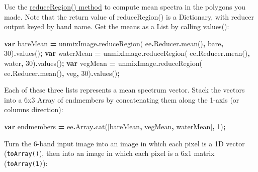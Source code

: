 \documentclass[
]{article}
\newenvironment{Shaded}{\begin{snugshade}}{\end{snugshade}}
\newcommand{\AttributeTok}[1]{\textcolor[rgb]{0.77,0.63,0.00}{#1}}
\newcommand{\DecValTok}[1]{\textcolor[rgb]{0.00,0.00,0.81}{#1}}
\newcommand{\FunctionTok}[1]{\textcolor[rgb]{0.00,0.00,0.00}{#1}}
\newcommand{\KeywordTok}[1]{\textcolor[rgb]{0.13,0.29,0.53}{\textbf{#1}}}
\newcommand{\NormalTok}[1]{#1}
\newcommand{\OperatorTok}[1]{\textcolor[rgb]{0.81,0.36,0.00}{\textbf{#1}}}
\begin{document}
Use the \href{https://developers.google.com/earth-engine/reducers_reduce_region}{reduceRegion() method} to compute mean spectra in the polygons you made. Note that the return value of reduceRegion() is a Dictionary, with reducer output keyed by band name. Get the means as a List by calling values():

\begin{Shaded}
\begin{Highlighting}[]
\KeywordTok{var}\NormalTok{ bareMean }\OperatorTok{=}\NormalTok{ unmixImage}\OperatorTok{.}\FunctionTok{reduceRegion}\NormalTok{(}
\NormalTok{  ee}\OperatorTok{.}\AttributeTok{Reducer}\OperatorTok{.}\FunctionTok{mean}\NormalTok{()}\OperatorTok{,}\NormalTok{ bare}\OperatorTok{,} \DecValTok{30}\NormalTok{)}\OperatorTok{.}\FunctionTok{values}\NormalTok{()}\OperatorTok{;}   
\KeywordTok{var}\NormalTok{ waterMean }\OperatorTok{=}\NormalTok{ unmixImage}\OperatorTok{.}\FunctionTok{reduceRegion}\NormalTok{(}
\NormalTok{  ee}\OperatorTok{.}\AttributeTok{Reducer}\OperatorTok{.}\FunctionTok{mean}\NormalTok{()}\OperatorTok{,}\NormalTok{ water}\OperatorTok{,} \DecValTok{30}\NormalTok{)}\OperatorTok{.}\FunctionTok{values}\NormalTok{()}\OperatorTok{;}   
\KeywordTok{var}\NormalTok{ vegMean }\OperatorTok{=}\NormalTok{ unmixImage}\OperatorTok{.}\FunctionTok{reduceRegion}\NormalTok{(}
\NormalTok{  ee}\OperatorTok{.}\AttributeTok{Reducer}\OperatorTok{.}\FunctionTok{mean}\NormalTok{()}\OperatorTok{,}\NormalTok{ veg}\OperatorTok{,} \DecValTok{30}\NormalTok{)}\OperatorTok{.}\FunctionTok{values}\NormalTok{()}\OperatorTok{;}  
\end{Highlighting}
\end{Shaded}

Each of these three lists represents a mean spectrum vector. Stack the vectors into a 6x3 Array of endmembers by concatenating them along the 1-axis (or columns direction):

\begin{Shaded}
\begin{Highlighting}[]
\KeywordTok{var}\NormalTok{ endmembers }\OperatorTok{=}\NormalTok{ ee}\OperatorTok{.}\AttributeTok{Array}\OperatorTok{.}\FunctionTok{cat}\NormalTok{([bareMean}\OperatorTok{,}\NormalTok{  vegMean}\OperatorTok{,}\NormalTok{ waterMean]}\OperatorTok{,} \DecValTok{1}\NormalTok{)}\OperatorTok{;}  
\end{Highlighting}
\end{Shaded}

Turn the 6-band input image into an image in which each pixel is a 1D vector (\texttt{toArray()}), then into an image in which each pixel is a 6x1 matrix (\texttt{toArray(1)}):
\end{document}
